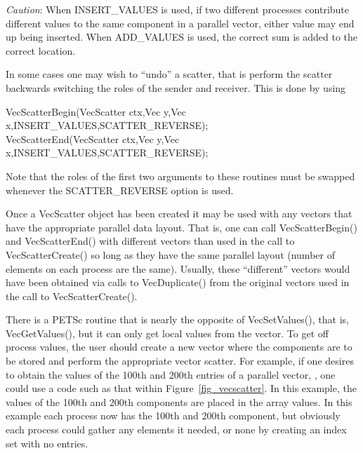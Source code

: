 {\em Caution}: When INSERT\_VALUES is used, if two different
processes contribute different values to the same component in a
parallel vector, either value may end up being inserted. When
ADD\_VALUES is used, the correct sum is added to the correct
location.

In some cases one may wish to ``undo'' a scatter, that is perform the
scatter backwards switching the roles of the sender and receiver. This is
done by using
\begin{tabbing}
  VecScatterBegin(VecScatter ctx,Vec y,Vec x,INSERT\_VALUES,SCATTER\_REVERSE);\\
  VecScatterEnd(VecScatter ctx,Vec y,Vec x,INSERT\_VALUES,SCATTER\_REVERSE);
\end{tabbing}
Note that the roles of the first
two arguments to these routines must be swapped whenever the SCATTER\_REVERSE
option is used.

Once a VecScatter object has been created it may be used with any vectors
that have the appropriate parallel data layout. That is, one can call
VecScatterBegin() and VecScatterEnd() with different vectors than
used in the call to VecScatterCreate() so long as they have the same
parallel layout (number of elements on each process are the same). Usually,
these ``different'' vectors would have been obtained via calls to
VecDuplicate() from the original vectors used in the call to
VecScatterCreate().

There is a PETSc routine that is nearly the opposite of VecSetValues(), that is, VecGetValues(), but it can only get
local values from the vector.
To get off process values, the user should create a new vector where
the components are to be stored and perform the appropriate vector
scatter. For example, if one desires to obtain the values of the
100th and 200th entries of a parallel vector, , one could use
a code such as that within Figure~\ref{fig_vecscatter}.
In this example, the values of the 100th and 200th components are
placed in the array
values. In this example each process now has the 100th and
200th component, but obviously each process could gather any
elements it needed, or none by creating an index set with no entries.

